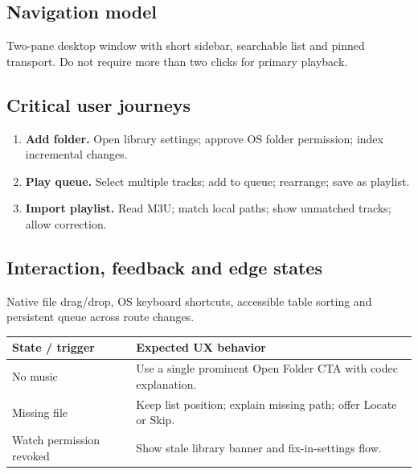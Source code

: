 \documentclass[10pt,a4paper,oneside]{report}
\begin{document}
\subsection*{Navigation model}
Two-pane desktop window with short sidebar, searchable list and pinned transport. Do not require more than two clicks for primary playback.\par
\subsection*{Critical user journeys}
\begin{enumerate}[leftmargin=*,itemsep=3pt,topsep=2pt]
\item \textbf{Add folder.} Open library settings; approve OS folder permission; index incremental changes.
\item \textbf{Play queue.} Select multiple tracks; add to queue; rearrange; save as playlist.
\item \textbf{Import playlist.} Read M3U; match local paths; show unmatched tracks; allow correction.
\end{enumerate}
\subsection*{Interaction, feedback and edge states}
Native file drag/drop, OS keyboard shortcuts, accessible table sorting and persistent queue across route changes.\par
\begin{tabularx}{\linewidth}{@{}p{39mm}X@{}}\toprule State / trigger & Expected UX behavior\\\midrule
No music & Use a single prominent Open Folder CTA with codec explanation.\\
Missing file & Keep list position; explain missing path; offer Locate or Skip.\\
Watch permission revoked & Show stale library banner and fix-in-settings flow.\\
\bottomrule\end{tabularx}
\end{document}
